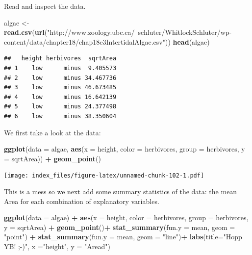 \documentclass[]{article}
\newenvironment{Shaded}{\begin{snugshade}}{\end{snugshade}}
\newcommand{\DataTypeTok}[1]{\textcolor[rgb]{0.13,0.29,0.53}{#1}}
\newcommand{\KeywordTok}[1]{\textcolor[rgb]{0.13,0.29,0.53}{\textbf{#1}}}
\newcommand{\NormalTok}[1]{#1}
\newcommand{\OperatorTok}[1]{\textcolor[rgb]{0.81,0.36,0.00}{\textbf{#1}}}
\newcommand{\StringTok}[1]{\textcolor[rgb]{0.31,0.60,0.02}{#1}}
\begin{document}
Read and inspect the data.

\begin{Shaded}
\begin{Highlighting}[]
\NormalTok{algae <-}\StringTok{ }\KeywordTok{read.csv}\NormalTok{(}\KeywordTok{url}\NormalTok{(}\StringTok{"http://www.zoology.ubc.ca/~schluter/WhitlockSchluter/wp-content/data/chapter18/chap18e3IntertidalAlgae.csv"}\NormalTok{))}
\KeywordTok{head}\NormalTok{(algae)}
\end{Highlighting}
\end{Shaded}

\begin{verbatim}
##   height herbivores  sqrtArea
## 1    low      minus  9.405573
## 2    low      minus 34.467736
## 3    low      minus 46.673485
## 4    low      minus 16.642139
## 5    low      minus 24.377498
## 6    low      minus 38.350604
\end{verbatim}

We first take a look at the data:

\begin{Shaded}
\begin{Highlighting}[]
\KeywordTok{ggplot}\NormalTok{(}\DataTypeTok{data =}\NormalTok{ algae,  }\KeywordTok{aes}\NormalTok{(}\DataTypeTok{x =}\NormalTok{ height, }\DataTypeTok{color =}\NormalTok{ herbivores, }\DataTypeTok{group =}\NormalTok{ herbivores, }\DataTypeTok{y =}\NormalTok{ sqrtArea)) }\OperatorTok{+}
\StringTok{  }\KeywordTok{geom_point}\NormalTok{()}
\end{Highlighting}
\end{Shaded}

\texttt{[image: index\_files/figure-latex/unnamed-chunk-102-1.pdf]}

This is a mess so we next add some summary statistics of the data: the
mean Area for each combination of explanatory variables.

\begin{Shaded}
\begin{Highlighting}[]
\KeywordTok{ggplot}\NormalTok{(}\DataTypeTok{data =}\NormalTok{ algae) }\OperatorTok{+}
\StringTok{  }\KeywordTok{aes}\NormalTok{(}\DataTypeTok{x =}\NormalTok{ height, }\DataTypeTok{color =}\NormalTok{ herbivores, }\DataTypeTok{group =}\NormalTok{ herbivores, }\DataTypeTok{y =}\NormalTok{ sqrtArea) }\OperatorTok{+}
\StringTok{    }\KeywordTok{geom_point}\NormalTok{()}\OperatorTok{+}
\StringTok{  }\KeywordTok{stat_summary}\NormalTok{(}\DataTypeTok{fun.y =}\NormalTok{ mean, }\DataTypeTok{geom =} \StringTok{"point"}\NormalTok{) }\OperatorTok{+}
\StringTok{  }\KeywordTok{stat_summary}\NormalTok{(}\DataTypeTok{fun.y =}\NormalTok{ mean, }\DataTypeTok{geom =} \StringTok{"line"}\NormalTok{)}\OperatorTok{+}\StringTok{ }
\StringTok{  }\KeywordTok{labs}\NormalTok{(}\DataTypeTok{title=}\StringTok{"Hopp YB! ;-)"}\NormalTok{,}
        \DataTypeTok{x =}\StringTok{"height"}\NormalTok{, }\DataTypeTok{y =} \StringTok{"Aread"}\NormalTok{)}
\end{Highlighting}
\end{Shaded}
\end{document}
